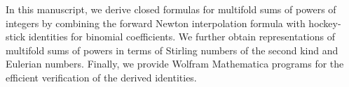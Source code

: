 In this manuscript, we derive closed formulas for multifold sums of powers of integers by combining the forward Newton interpolation formula with hockey-stick identities for binomial coefficients. We further obtain representations of multifold sums of powers in terms of Stirling numbers of the second kind and Eulerian numbers. Finally, we provide Wolfram Mathematica programs for the efficient verification of the derived identities.